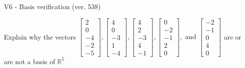 \begin{exercise}
  \begin{exerciseTitle}V6 - Basis verification (ver. 538)\end{exerciseTitle}
  \begin{exerciseStatement}
    Explain why the vectors \(\left[\begin{array}{r}
2 \\
0 \\
-4 \\
-2 \\
-5
\end{array}\right] , \left[\begin{array}{r}
4 \\
0 \\
-3 \\
1 \\
-4
\end{array}\right] , \left[\begin{array}{r}
4 \\
2 \\
-3 \\
4 \\
-1
\end{array}\right] , \left[\begin{array}{r}
0 \\
-2 \\
-1 \\
2 \\
0
\end{array}\right] , \text{ and } \left[\begin{array}{r}
-2 \\
-1 \\
0 \\
4 \\
0
\end{array}\right]\) are or are not a basis of \(\mathbb{R}^5\)	



\end{exerciseStatement}
\end{exercise}
